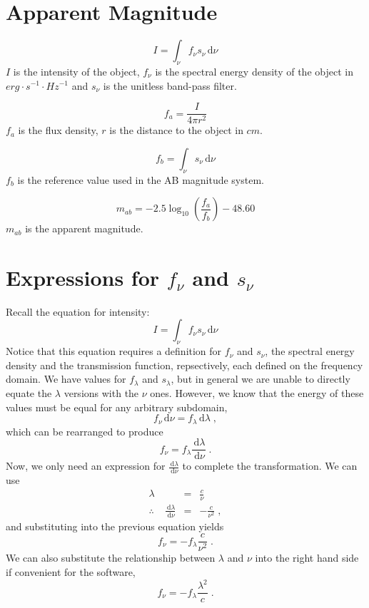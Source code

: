 \documentclass[12pt]{scrartcl}
\newcommand{\dx}[1]{\ensuremath{\,\mathrm{d}#1}}
\begin{document}
\maketitle

\section{Apparent Magnitude}

\[ I = \int_\nu f_\nu s_\nu \dx{\nu} \]
$I$ is the intensity of the object, $f_\nu$ is the spectral energy density of
the object in $erg\cdot s^{-1}\cdot Hz^{-1}$ and $s_\nu$ is the unitless band-pass filter.

\[ f_a = \frac{I}{4\pi r^2} \]
$f_a$ is the flux density, $r$ is the distance to the object in $cm$.

\[ f_b = \int_\nu s_\nu \dx{\nu} \]
$f_b$ is the reference value used in the AB magnitude system.

\[ m_{ab} = -2.5\log_{10}\left(\frac{f_a}{f_b}\right) - 48.60 \]
$m_{ab}$ is the apparent magnitude.

\section{Expressions for $f_\nu$ and $s_\nu$}

Recall the equation for intensity:
\[ I = \int_\nu f_\nu s_\nu \dx{\nu} \]
Notice that this equation requires a definition for $f_\nu$ and $s_\nu$,
the spectral energy density and the transmission function, repsectively, each
defined on the frequency domain. We have values for $f_\lambda$ and $s_\lambda$,
but in general we are unable to directly equate the $\lambda$ versions with
the $\nu$ ones. However, we know that the energy of these values
must be equal for any arbitrary subdomain,
\[ f_\nu \dx{\nu} = f_\lambda \dx{\lambda} \; , \]
which can be rearranged to produce
\[ f_\nu = f_\lambda \frac{\dx{\lambda}}{\dx{\nu}} \; . \]
Now, we only need an expression for $\frac{\dx{\lambda}}{\dx{\nu}}$
to complete the transformation. We can use
\begin{eqnarray*}
\lambda & = & \frac{c}{\nu} \\
\therefore \;\;\;\; \frac{\dx{\lambda}}{\dx{\nu}} & = & -\frac{c}{\nu^2} \; ,
\end{eqnarray*}
and substituting into the previous equation yields
\[ f_\nu = -f_\lambda \frac{c}{\nu^2} \; . \]
We can also substitute the relationship between $\lambda$ and $\nu$ into
the right hand side if convenient for the software,
\[ f_\nu = -f_\lambda \frac{\lambda^2}{c} \; . \]
\end{document}
